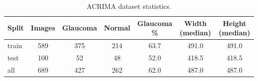 \begin{table}[t]
\centering
\caption{ACRIMA dataset statistics.}
\label{tab:dataset}
\begin{tabular}{lcccccc}
\toprule
Split & Images & Glaucoma & Normal & Glaucoma \% & Width (median) & Height (median) \\
\midrule
train & 589 & 375 & 214 & 63.7 & 491.0 & 491.0 \\
test & 100 & 52 & 48 & 52.0 & 418.5 & 418.5 \\
all & 689 & 427 & 262 & 62.0 & 487.0 & 487.0 \\
\bottomrule
\end{tabular}
\end{table}